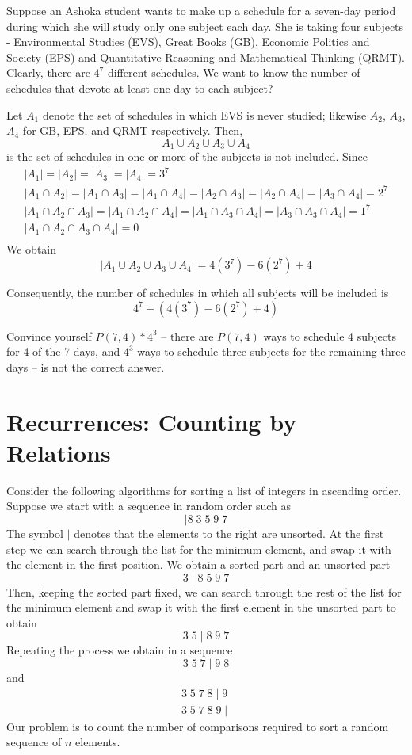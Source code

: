 \begin{example}
Suppose an Ashoka student wants to make up a schedule for a seven-day period during which she will study only one subject each day. She is taking four subjects - Environmental Studies (EVS), Great Books (GB), Economic Politics and Society (EPS) and Quantitative Reasoning and Mathematical Thinking (QRMT). Clearly, there are $4^7$ different schedules. We want to know the number of schedules that devote at least one day to each subject?

Let $A_1$ denote the set of schedules in which EVS is never studied; likewise $A_2$, $A_3$, $A_4$ for GB, EPS, and QRMT respectively. Then,
\[
A_1 \cup A_2  \cup A_3  \cup A_4
\]
is the set of schedules in one or more of the subjects is not included.
Since
\[
\begin{array}{l}
\mid A_1 \mid = \mid A_2  \mid = \mid A_3  \mid =  \mid A_4 \mid = 3^7 \\
\mid A_1 \cap A_2 \mid = \mid A_1 \cap A_3 \mid = \mid A_1 \cap A_4 \mid = \mid A_2 \cap A_3 \mid =  \mid A_2 \cap A_4 \mid = \mid A_3 \cap A_4 \mid = 2^7 \\
\mid A_1 \cap A_2 \cap A_3 \mid = \mid A_1 \cap A_2 \cap A_4 \mid =  \mid A_1 \cap A_3 \cap A_4 \mid = \mid A_3 \cap A_3 \cap A_4 \mid = 1^7 \\
\mid A_1 \cap A_2 \cap A_3 \cap A_4 \mid = 0 \\
\end{array}
\]
We obtain
\[
\mid A_1 \cup A_2  \cup A_3  \cup A_4 \mid = 4(3^7) - 6(2^7) + 4
\]
\end{example}
Consequently, the number of schedules in which all subjects will be included is
\[
4^7 - (4(3^7) - 6(2^7) + 4)
\]
\begin{exercise}
Convince yourself $P(7,4)*4^3$ -- there are $P(7,4)$ ways to schedule 4 subjects for 4 of the 7 days, and $4^3$ ways to schedule three subjects for the remaining three days -- is not the correct answer.
\end{exercise}

\section{Recurrences: Counting by Relations}

Consider the following algorithms for sorting a list of integers in ascending order. Suppose we start with a sequence in random order such as
\[
\mid 8 \;3\;5\;9\;7
\] 
The symbol $\mid$ denotes that the elements to the right are unsorted. At the first step we can search through the list for the minimum element, and swap it with the element in the first position. We obtain a sorted part and an unsorted part
\[
3\mid8\;5\;9\;7
\]
Then, keeping the sorted part fixed, we can search through the rest of the list for the minimum element and swap it with the first element in the unsorted part to obtain
\[
3\;5\mid8\;9\;7
\]
Repeating the process we obtain in a sequence
\[
3\;5\;7\mid 9\;8
\]
and
\[
\begin{array}{l}
3\;5\;7\;8\mid 9 \\
3\;5\;7\;8\; 9 \mid
\end{array}
\]
Our problem is to count the number of comparisons required to sort a random sequence of $n$ elements.  

